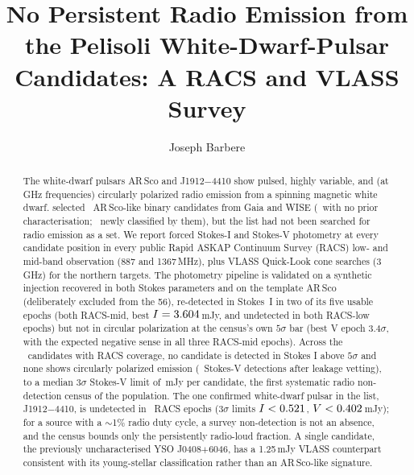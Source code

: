 \documentclass[twocolumn]{aastex631}
\begin{document}
\title{No Persistent Radio Emission from the Pelisoli White-Dwarf-Pulsar Candidates: A
RACS and VLASS Survey}
\author[0009-0008-3289-4447]{Joseph Barbere}

\begin{abstract}
The white-dwarf pulsars AR\,Sco and J1912$-$4410 show pulsed, highly variable, and (at GHz
frequencies) circularly polarized radio emission from a spinning magnetic white dwarf.
\citet{pelisoli2025} selected \wdNCand\ AR\,Sco-like binary candidates from Gaia and
WISE (\wdNUnchar\ with no prior characterisation; \wdNClassNew\ newly classified by them), but
the list had not been searched for radio emission as a set. We report forced Stokes-I and
Stokes-V photometry at every candidate position in every public Rapid ASKAP Continuum Survey
(RACS) low- and mid-band observation (887 and 1367\,MHz), plus VLASS Quick-Look cone searches
(3\,GHz) for the northern targets. The photometry pipeline is validated on a synthetic
injection recovered in both Stokes parameters and on the template AR\,Sco (deliberately
excluded from the 56), re-detected in Stokes~I in two of its five usable epochs (both
RACS-mid, best $I=3.604$\,mJy, and undetected in both RACS-low epochs) but not in
circular polarization at the census's own $5\sigma$ bar (best V epoch $3.4\sigma$, with the
expected negative sense in all three RACS-mid epochs). Across the
\wdRealNCandCovered\ candidates with RACS coverage, no candidate is detected in Stokes I above
$5\sigma$ and none shows circularly polarized emission (\wdRealNCandVDet\ Stokes-V detections
after leakage vetting), to a median $3\sigma$ Stokes-V limit of \wdRealMedianVLimit\,mJy per
candidate,
the first systematic radio non-detection census of the population. The one confirmed
white-dwarf pulsar in the list,
J1912$-$4410, is undetected in \wdRealJEpochs\ RACS epochs ($3\sigma$ limits
$I<0.521$, $V<0.402$\,mJy); for a source with a $\sim$1\% radio duty cycle, a
survey non-detection is not an absence, and the census bounds only the persistently
radio-loud fraction. A single candidate, the previously uncharacterised YSO J0408$+$6046, has
a 1.25\,mJy VLASS counterpart consistent with its young-stellar classification rather than an
AR\,Sco-like signature.
\end{abstract}

\end{document}
